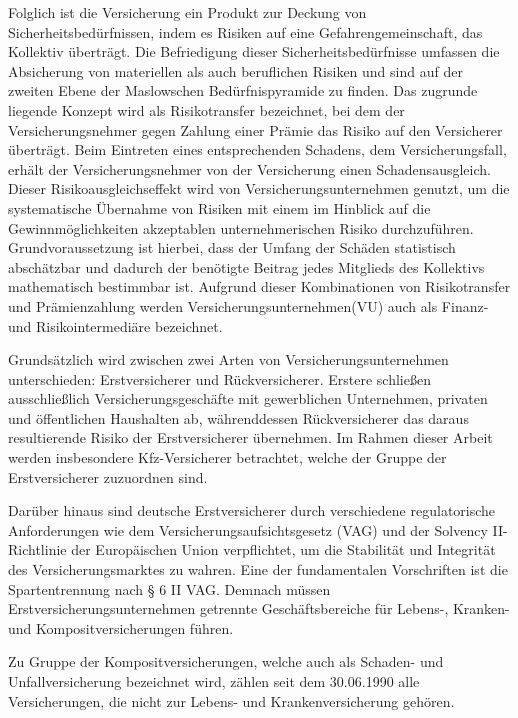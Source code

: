 Folglich ist die Versicherung ein Produkt zur Deckung von Sicherheitsbedürfnissen, indem es Risiken auf eine Gefahrengemeinschaft, das Kollektiv überträgt. Die Befriedigung dieser Sicherheitsbedürfnisse umfassen die Absicherung von materiellen als auch beruflichen Risiken und sind auf der zweiten Ebene der Maslowschen Bedürfnispyramide zu finden. \autocite[Vgl.][S. 30]{BECKER2019} Das zugrunde liegende Konzept wird als Risikotransfer bezeichnet, bei dem der Versicherungsnehmer gegen Zahlung einer Prämie das Risiko auf den Versicherer überträgt. Beim Eintreten eines entsprechenden Schadens, dem Versicherungsfall, erhält der Versicherungsnehmer von der Versicherung einen Schadensausgleich. Dieser Risikoausgleichseffekt wird von Versicherungsunternehmen genutzt, um die systematische Übernahme von Risiken mit einem im Hinblick auf die Gewinnmöglichkeiten akzeptablen unternehmerischen Risiko durchzuführen. \autocite[Vgl.][S. 9]{FARNY2011}
Grundvoraussetzung ist hierbei, dass der Umfang der Schäden statistisch abschätzbar und dadurch der benötigte Beitrag jedes Mitglieds des Kollektivs mathematisch bestimmbar ist. Aufgrund dieser Kombinationen von Risikotransfer und Prämienzahlung werden Versicherungsunternehmen(VU) auch als Finanz- und Risikointermediäre bezeichnet. \autocite[Vgl.][S. 53]{ZWACK2017}

Grundsätzlich wird zwischen zwei Arten von Versicherungsunternehmen unterschieden: Erstversicherer und Rückversicherer. Erstere schließen ausschließlich Versicherungsgeschäfte mit gewerblichen Unternehmen, privaten und öffentlichen Haushalten ab, währenddessen Rückversicherer das daraus resultierende Risiko der Erstversicherer übernehmen.\autocite[Vgl.][S. 240f.]{FARNY2011} Im Rahmen dieser Arbeit werden insbesondere Kfz-Versicherer betrachtet, welche der Gruppe der Erstversicherer zuzuordnen sind.

Darüber hinaus sind deutsche Erstversicherer durch verschiedene regulatorische Anforderungen wie dem Versicherungsaufsichtsgesetz (VAG) und der Solvency II-Richtlinie der Europäischen Union verpflichtet, um die Stabilität und Integrität des Versicherungsmarktes zu wahren. \autocite[Vgl.][]{BAFIN2016} Eine der fundamentalen Vorschriften ist die Spartentrennung nach § 6 II VAG. Demnach müssen Erstversicherungsunternehmen getrennte Geschäftsbereiche für Lebens-, Kranken- und Kompositversicherungen führen. 

Zu Gruppe der Kompositversicherungen, welche auch als Schaden- und Unfallversicherung bezeichnet wird, zählen seit dem 30.06.1990 alle Versicherungen, die nicht zur Lebens- und Krankenversicherung gehören. \autocite[Vgl.][S. 241-243]{FARNY2011} 


